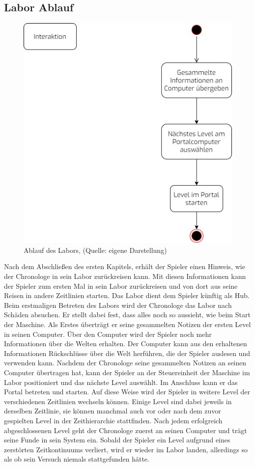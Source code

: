 \subsection{Labor Ablauf}
\begin{figure}[ht]
\centering
\includegraphics[width=0.4\linewidth]{content/pictures/labor_loop.jpg}
\caption{Ablauf des Labors, (Quelle: eigene Darstellung)}
\label{fig:labor_loop}
\end{figure}

Nach dem Abschließen des ersten Kapitels, erhält der Spieler einen Hinweis, wie der Chronologe in sein Labor zurückreisen kann. Mit diesen Informationen kann der Spieler zum ersten Mal in sein Labor zurückreisen und von dort aus seine Reisen in andere Zeitlinien starten. Das Labor dient dem Spieler künftig als Hub. Beim erstmaligen Betreten des Labors wird der Chronologe das Labor nach Schäden absuchen. Er stellt dabei fest, dass alles noch so aussieht, wie beim Start der Maschine. Als Erstes überträgt er seine gesammelten Notizen der ersten Level in seinen Computer. Über den Computer wird der Spieler noch mehr Informationen über die Welten erhalten. Der Computer kann aus den erhaltenen Informationen Rückschlüsse über die Welt herführen, die der Spieler auslesen und verwenden kann. Nachdem der Chronologe seine gesammelten Notizen an seinen Computer übertragen hat, kann der Spieler an der Steuereinheit der Maschine im Labor positioniert und das nächste Level auswählt. Im Anschluss kann er das Portal betreten und starten. Auf diese Weise wird der Spieler in weitere Level der verschiedenen Zeitlinien wechseln können. Einige Level sind dabei jeweils in derselben Zeitlinie, sie können manchmal auch vor oder nach dem zuvor gespielten Level in der Zeithierarchie stattfinden. Nach jedem erfolgreich abgeschlossenen Level geht der Chronologe zuerst an seinen Computer und trägt seine Funde in sein System ein. Sobald der Spieler ein Level aufgrund eines zerstörten Zeitkontinuums verliert, wird er wieder im Labor landen, allerdings so als ob sein Versuch niemals stattgefunden hätte.

